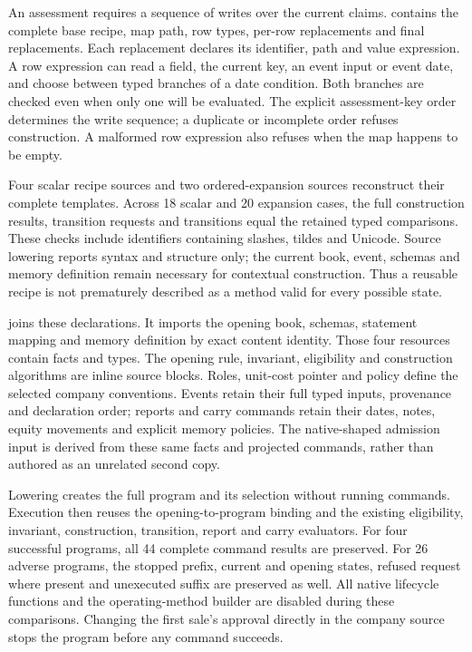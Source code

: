 An assessment requires a sequence of writes over the current claims.
 contains the complete base recipe, map path,
row types, per-row replacements and final replacements. Each replacement
declares its identifier, path and value expression. A row expression can read
a field, the current key, an event input or event date, and choose between
typed branches of a date condition. Both branches are checked even when only
one will be evaluated. The explicit assessment-key order determines the write
sequence; a duplicate or incomplete order refuses construction. A malformed
row expression also refuses when the map happens to be empty.

Four scalar recipe sources and two ordered-expansion sources reconstruct their
complete templates. Across 18 scalar and 20 expansion cases, the full
construction results, transition requests and transitions equal the retained
typed comparisons. These checks include identifiers containing slashes, tildes
and Unicode. Source lowering reports syntax and structure only; the current
book, event, schemas and memory definition remain necessary for contextual
construction. Thus a reusable recipe is not prematurely described as a method
valid for every possible state.

 joins these declarations. It imports the opening
book, schemas, statement mapping and memory definition by exact content
identity. Those four resources contain facts and types. The opening rule,
invariant, eligibility and construction algorithms are inline source blocks.
Roles, unit-cost pointer and policy define the selected company conventions.
Events retain their full typed inputs, provenance and declaration order;
reports and carry commands retain their dates, notes, equity movements and
explicit memory policies. The native-shaped admission input is derived from
these same facts and projected commands, rather than authored as an unrelated
second copy.

Lowering creates the full program and its selection without running commands.
Execution then reuses the opening-to-program binding and the existing
eligibility, invariant, construction, transition, report and carry evaluators.
For four successful programs, all 44 complete command results are preserved.
For 26 adverse programs, the stopped prefix, current and opening states,
refused request where present and unexecuted suffix are preserved as well.
All native lifecycle functions and the operating-method builder are disabled
during these comparisons. Changing the first sale's approval directly in the
company source stops the program before any command succeeds.

